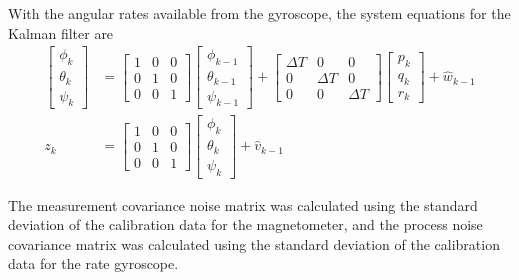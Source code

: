 \documentclass[12pt]{ucthesis}
\begin{document}
With the angular rates available from the gyroscope, the system equations for the Kalman filter are
\begin{align}
\begin{bmatrix}
\phi_{k}\\
\theta_{k}\\
\psi_{k}
\end{bmatrix} & = \begin{bmatrix}
1 & 0 & 0\\0 & 1 & 0\\0 & 0 & 1
\end{bmatrix}\begin{bmatrix}
\phi_{k-1}\\
\theta_{k-1}\\
\psi_{k-1}
\end{bmatrix}
+ \begin{bmatrix}
\Delta T & 0 & 0 \\ 0 & \Delta T & 0\\0 & 0 & \Delta T
\end{bmatrix}\begin{bmatrix} 
p_k \\ q_k \\ r_k 
\end{bmatrix}+\hat{w}_{k-1}\\
z_k & = \begin{bmatrix}
1 & 0 &0\\0&1&0\\0&0&1
\end{bmatrix}\begin{bmatrix}
\phi_{k}\\
\theta_{k}\\
\psi_{k}
\end{bmatrix}+\hat{v}_{k-1}
\end{align}

The measurement covariance noise matrix was calculated using the standard deviation of the calibration data for the magnetometer, and the process noise covariance matrix was calculated using the standard deviation of the calibration data for the rate gyroscope.
\end{document}
